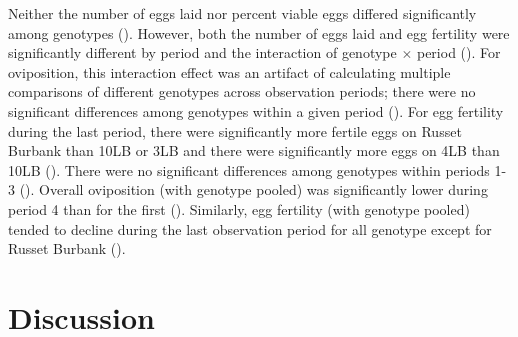 \documentclass[]{article}
\begin{document}
Neither the number of eggs laid nor percent viable eggs differed
significantly among genotypes (). However, both the number of eggs laid
and egg fertility were significantly different by period and the
interaction of genotype \(\times\) period (). For oviposition, this
interaction effect was an artifact of calculating multiple comparisons
of different genotypes across observation periods; there were no
significant differences among genotypes within a given period (). For
egg fertility during the last period, there were significantly more
fertile eggs on Russet Burbank than 10LB or 3LB and there were
significantly more eggs on 4LB than 10LB (). There were no significant
differences among genotypes within periods 1-3 (). Overall oviposition
(with genotype pooled) was significantly lower during period 4 than for
the first (). Similarly, egg fertility (with genotype pooled) tended to
decline during the last observation period for all genotype except for
Russet Burbank ().

\hypertarget{ch:discuss}{%
\section{Discussion}\label{ch:discuss}}
\end{document}
